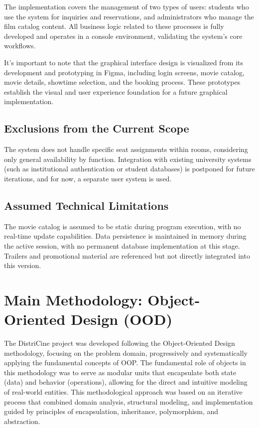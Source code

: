 \documentclass[12pt]{article}
\begin{document}
The implementation covers the management of two types of users: students who use the system for inquiries and reservations, and administrators who manage the film catalog content. All business logic related to these processes is fully developed and operates in a console environment, validating the system's core workflows.

It's important to note that the graphical interface design is visualized from its development and prototyping in Figma, including login screens, movie catalog, movie details, showtime selection, and the booking process. These prototypes establish the visual and user experience foundation for a future graphical implementation.

\subsection{Exclusions from the Current Scope}
The system does not handle specific seat assignments within rooms, considering only general availability by function. Integration with existing university systems (such as institutional authentication or student databases) is postponed for future iterations, and for now, a separate user system is used.

\subsection{Assumed Technical Limitations}
The movie catalog is assumed to be static during program execution, with no real-time update capabilities. Data persistence is maintained in memory during the active session, with no permanent database implementation at this stage. Trailers and promotional material are referenced but not directly integrated into this version.

\section{Main Methodology: Object-Oriented Design (OOD)}
The DistriCine project was developed following the Object-Oriented Design methodology, focusing on the problem domain, progressively and systematically applying the fundamental concepts of OOP. The fundamental role of objects in this methodology was to serve as modular units that encapsulate both state (data) and behavior (operations), allowing for the direct and intuitive modeling of real-world entities. This methodological approach was based on an iterative process that combined domain analysis, structural modeling, and implementation guided by principles of encapsulation, inheritance, polymorphism, and abstraction.
\end{document}
